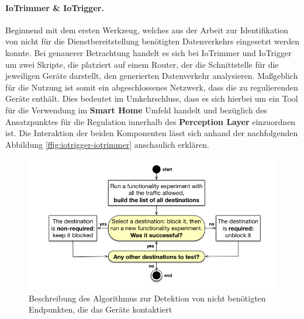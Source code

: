 \paragraph{IoTrimmer \& IoTrigger.} %
\label{sec:Hauptteil:ssec:Regulationsmöglichkeiten:para:IoTrimmer and IoTrigger}
Beginnend mit dem ersten Werkzeug, welches aus der Arbeit \cite{Mandalari2021} zur Identifikation von nicht für die Dienstbereitstellung benötigten Datenverkehrs eingesetzt werden konnte. Bei genauerer Betrachtung handelt es sich bei IoTrimmer und IoTrigger \cite{IoTrim2021} um zwei Skripte, die platziert auf einem Router, der die Schnittstelle für die jeweiligen Geräte darstellt, den generierten Datenverkehr analysieren. Maßgeblich für die Nutzung ist somit ein abgeschlossenes Netzwerk, dass die zu regulierenden Geräte enthält. Dies bedeutet im Umkehrschluss, dass es sich hierbei um ein Tool für die Verwendung im \textbf{Smart Home} Umfeld handelt und bezüglich des Ansatzpunktes für die Regulation innerhalb des \textbf{Perception Layer} einzuordnen ist.
Die Interaktion der beiden Komponenten lässt sich anhand der nachfolgenden Abbildung \ref{ffig:iotrigger-iotrimmer} anschaulich erklären.
\begin{figure}
    \centering
    \includegraphics[width=\textwidth]{main/pictures/countermeasures/Identification_Non_Essential_Traffic}
    \caption{Beschreibung des Algorithmus zur Detektion von nicht benötigten Endpunkten, die das Geräte kontaktiert \cite{Mandalari2021}}
    \label{fig:iotrigger-iotrimmer}
\end{figure}

